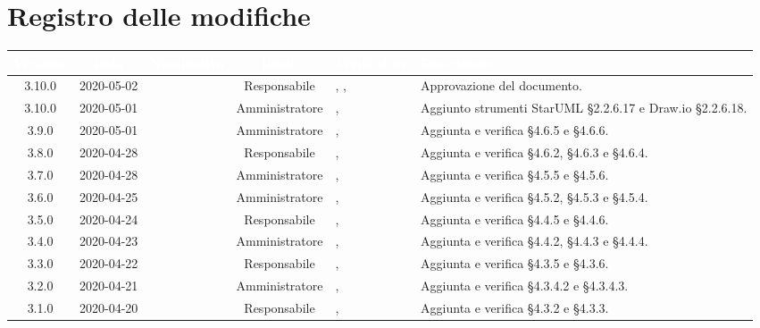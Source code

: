 \section*{Registro delle modifiche}
{
\renewcommand{\arraystretch}{1.5}
\centering
\begin{longtable}{ c c  C{2.3cm} c C{3cm} C{3.2cm}}
\textcolor{white}{\textbf{Versione}}&
\textcolor{white}{\textbf{Data}}&
\textcolor{white}{\textbf{Nominativo}}&
\textcolor{white}{\textbf{Ruolo}}&
\textcolor{white}{\textbf{Verificatore}}&
\textcolor{white}{\textbf{Descrizione}}\\	
\endhead

3.10.0 & 2020-05-02 & \DF{} & Responsabile & \AT{}, \PF{}, \MC{} &  Approvazione del documento. \\

3.10.0 & 2020-05-01 & \MC{} & Amministratore &  \AT{}, \PF{} & Aggiunto strumenti StarUML §2.2.6.17 e Draw.io §2.2.6.18. \\

3.9.0 & 2020-05-01 & \BR{} & Amministratore &  \AT{}, \PF{} & Aggiunta e verifica §4.6.5 e §4.6.6.  \\

3.8.0 & 2020-04-28 & \LD{} & Responsabile &  \AT{}, \PF{} & Aggiunta e verifica §4.6.2, §4.6.3 e §4.6.4.  \\

3.7.0 & 2020-04-28 & \SE{} & Amministratore &  \AT{}, \PF{} & Aggiunta e verifica §4.5.5 e §4.5.6.  \\

3.6.0 & 2020-04-25 & \BR{} & Amministratore &  \AT{}, \PF{} & Aggiunta e verifica §4.5.2, §4.5.3 e §4.5.4.  \\

3.5.0 & 2020-04-24 & \LD{} & Responsabile &  \AT{}, \PF{} & Aggiunta e verifica §4.4.5 e §4.4.6.  \\

3.4.0 & 2020-04-23 & \BR{} & Amministratore &  \AT{}, \PF{} & Aggiunta e verifica §4.4.2, §4.4.3 e §4.4.4.  \\

3.3.0 & 2020-04-22 & \LD{} & Responsabile &  \AT{}, \PF{} & Aggiunta e verifica §4.3.5 e §4.3.6.  \\

3.2.0 & 2020-04-21 & \SE{} & Amministratore &  \AT{}, \PF{} & Aggiunta e verifica §4.3.4.2 e §4.3.4.3.  \\

3.1.0 & 2020-04-20 & \LD{} & Responsabile &  \AT{}, \PF{} & Aggiunta e verifica §4.3.2 e §4.3.3.  \\


\end{longtable}}
